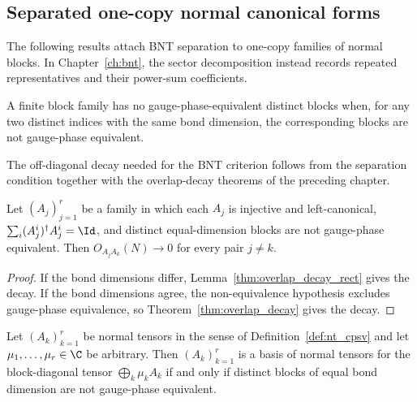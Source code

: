 \subsection{Separated one-copy normal canonical forms}
\label{subsec:normal_canonical_form_bnt_separation}

The following results attach BNT separation to one-copy families of normal
blocks. In Chapter~\ref{ch:bnt}, the sector decomposition instead
records repeated representatives and their power-sum coefficients.

\begin{definition}%
    \label{def:blocks_not_gauge_phase_equiv}
    \leanok
    A finite block family has no gauge-phase-equivalent distinct blocks when,
    for any two distinct indices with the same bond dimension, the corresponding
    blocks are not gauge-phase equivalent.
\end{definition}

The off-diagonal decay needed for the BNT criterion follows from the separation
condition together with the overlap-decay theorems of the preceding chapter.

\begin{lemma}
    \label{thm:cross_overlap_zero_split}
    \leanok
    Let $(A_j)_{j=1}^r$ be a family in which each $A_j$ is injective and
    left-canonical, $\sum_i (A_j^i)^\dagger A_j^i = \Id$, and distinct
    equal-dimension blocks are not gauge-phase equivalent. Then
    $O_{A_jA_k}(N) \to 0$ for every pair $j \neq k$.
\end{lemma}

\begin{proof}\leanok{}
    If the bond dimensions differ, Lemma~\ref{thm:overlap_decay_rect}
    gives the decay. If the bond dimensions agree, the non-equivalence
    hypothesis excludes gauge-phase equivalence, so
    Theorem~\ref{thm:overlap_decay} gives the decay.
\end{proof}

\begin{lemma}
    \label{lem:cf_bnt_is_bnt_split}
    \leanok
    Let $(A_k)_{k=1}^r$ be normal tensors in the sense of
    Definition~\ref{def:nt_cpsv} and let $\mu_1,\ldots,\mu_r\in\C$ be arbitrary.
    Then $(A_k)_{k=1}^r$ is a basis of normal tensors for the block-diagonal
    tensor $\bigoplus_k \mu_k A_k$ if and only if distinct blocks of equal bond
    dimension are not gauge-phase equivalent.
\end{lemma}

